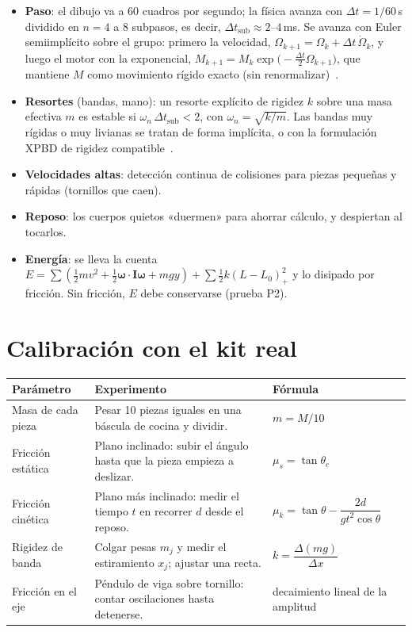 \documentclass[11pt,a4paper]{article}
\numberwithin{equation}{section}
\newcommand{\vect}[1]{\bm{#1}}
\newcommand{\I}{\mathbf{I}}
\begin{document}
\begin{itemize}[leftmargin=*]
  \item \textbf{Paso}: el dibujo va a 60 cuadros por segundo; la física avanza con $\Delta t = 1/60$\,s dividido en
        $n = 4$ a $8$ subpasos, es decir, $\Delta t_{\text{sub}} \approx 2$--$4$\,ms. Se avanza con Euler semiimplícito
        sobre el grupo: primero la velocidad, $\Omega_{k+1} = \Omega_k + \Delta t\,\dot\Omega_k$, y luego el motor con
        la exponencial, $M_{k+1} = M_k\exp\!\bigl(-\tfrac{\Delta t}{2}\Omega_{k+1}\bigr)$, que mantiene $M$ como
        movimiento rígido exacto (sin renormalizar)~\cite{hairer, iserles}.
  \item \textbf{Resortes} (bandas, mano): un resorte explícito de rigidez $k$ sobre una masa efectiva $m$ es estable si
        $\omega_n\,\Delta t_{\text{sub}} < 2$, con $\omega_n = \sqrt{k/m}$. Las bandas muy rígidas o muy livianas se
        tratan de forma implícita, o con la formulación XPBD de rigidez compatible~\cite{xpbd}.
  \item \textbf{Velocidades altas}: detección continua de colisiones para piezas pequeñas y rápidas (tornillos que caen).
  \item \textbf{Reposo}: los cuerpos quietos «duermen» para ahorrar cálculo, y despiertan al tocarlos.
  \item \textbf{Energía}: se lleva la cuenta $E = \sum(\tfrac12 m v^2 + \tfrac12\vect{\omega}\cdot\I\vect{\omega} + m g y)
        + \sum\tfrac12 k (L-L_0)_+^2$ y lo disipado por fricción. Sin fricción, $E$ debe conservarse (prueba P2).
\end{itemize}

\section{Calibración con el kit real}\label{sec:calibracion}

\begin{tabularx}{\linewidth}{@{}l Y l@{}}
\toprule
\textbf{Parámetro} & \textbf{Experimento} & \textbf{Fórmula}\\
\midrule
Masa de cada pieza & Pesar 10 piezas iguales en una báscula de cocina y dividir. & $m = M/10$\\
Fricción estática & Plano inclinado: subir el ángulo hasta que la pieza empieza a deslizar. & $\mu_s = \tan\theta_c$\\
Fricción cinética & Plano más inclinado: medir el tiempo $t$ en recorrer $d$ desde el reposo. &
  $\mu_k = \tan\theta - \dfrac{2d}{g t^2\cos\theta}$\\
Rigidez de banda & Colgar pesas $m_j$ y medir el estiramiento $x_j$; ajustar una recta. & $k = \dfrac{\Delta(m g)}{\Delta x}$\\
Fricción en el eje & Péndulo de viga sobre tornillo: contar oscilaciones hasta detenerse. & decaimiento lineal de la amplitud\\
\bottomrule
\end{tabularx}
\end{document}
